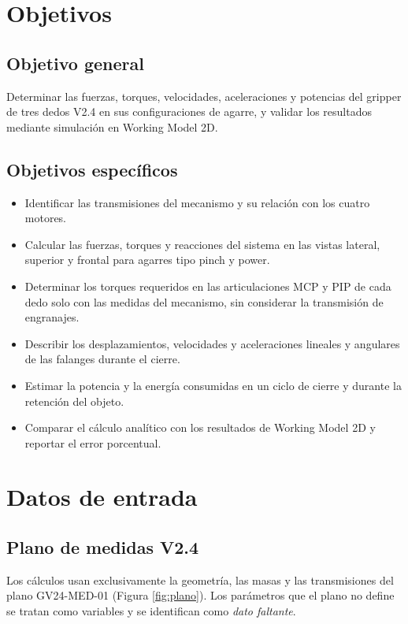 \documentclass[11pt,letterpaper]{article}
\begin{document}
\section{Objetivos}
\subsection{Objetivo general}
Determinar las fuerzas, torques, velocidades, aceleraciones y potencias del gripper de tres dedos V2.4 en sus configuraciones de agarre, y validar los resultados mediante simulación en Working Model 2D.

\subsection{Objetivos específicos}
\begin{itemize}
\item Identificar las transmisiones del mecanismo y su relación con los cuatro motores.
\item Calcular las fuerzas, torques y reacciones del sistema en las vistas lateral, superior y frontal para agarres tipo pinch y power.
\item Determinar los torques requeridos en las articulaciones MCP y PIP de cada dedo solo con las medidas del mecanismo, sin considerar la transmisión de engranajes.
\item Describir los desplazamientos, velocidades y aceleraciones lineales y angulares de las falanges durante el cierre.
\item Estimar la potencia y la energía consumidas en un ciclo de cierre y durante la retención del objeto.
\item Comparar el cálculo analítico con los resultados de Working Model 2D y reportar el error porcentual.
\end{itemize}

\section{Datos de entrada}
\subsection{Plano de medidas V2.4}
Los cálculos usan exclusivamente la geometría, las masas y las transmisiones del plano GV24-MED-01 (Figura \ref{fig:plano}). Los parámetros que el plano no define se tratan como variables y se identifican como \emph{dato faltante}.
\end{document}
